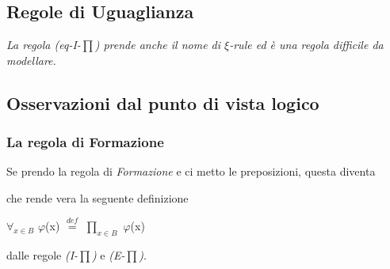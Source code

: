 \subsection{Regole di Uguaglianza}
\label{subsec: uguaglianza-prodottop-dip}
\begin{prooftree}
\end{prooftree}

\begin{prooftree}
\end{prooftree}
\textit{La regola (eq-I-{\scriptsize$\prod$}) prende anche il nome di $\xi$-rule ed \`e una regola difficile da modellare.}

\begin{prooftree}
\end{prooftree}
\normalsize

\subsection{Osservazioni dal punto di vista logico}
\label{subsec:osservazioni-dal-punto-di-vista-logico-prodotto-dip}

\subsubsection{La regola di Formazione}
\label{subsubsec:osservazioni-formazione-prodotto-dip}
Se prendo la regola di \textit{Formazione} e ci metto le preposizioni, questa diventa
\begin{prooftree}
\end{prooftree}
\noindent
che rende vera la seguente definizione
\begin{center}$\forall_{x \in B}$ $\varphi$(x) ${\overset{\mathit{def}}{=}}$ $\prod\limits_{x \in B}$ $\varphi$(x)\end{center}
dalle regole \textit{(I-{\scriptsize$\prod$})} e \textit{(E-{\scriptsize$\prod$})}.\\
